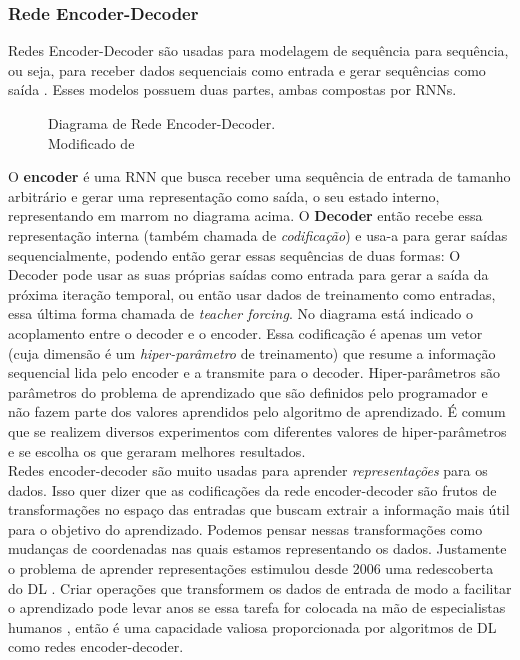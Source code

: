 \subsubsection{Rede Encoder-Decoder}
\label{sec:encdec}
Redes Encoder-Decoder são usadas para modelagem de sequência para
sequência, ou seja, para receber dados sequenciais como entrada e gerar
sequências como saída \citep{dlbook}. Esses modelos possuem duas partes, ambas compostas por
RNNs. \\

\begin{figure}[H]
\centering

\caption{ Diagrama de Rede Encoder-Decoder.\\ Modificado de \citep{encdec}}

\end{figure}
  
O \textbf{encoder} é uma RNN que busca receber uma sequência de entrada de
tamanho arbitrário e gerar uma representação como saída, o seu estado interno,
representando em marrom no diagrama acima. O \textbf{Decoder} então recebe essa representação interna (também chamada
de \textit{codificação}) e usa-a para gerar saídas sequencialmente, podendo
então gerar essas sequências de duas formas: O Decoder pode usar as suas próprias saídas
como entrada para gerar a saída da próxima iteração temporal, ou então usar dados de treinamento como
entradas, essa última forma chamada de \textit{teacher forcing}. No diagrama
está indicado o acoplamento entre o decoder e o encoder. Essa codificação é apenas
um vetor (cuja dimensão é um \textit{hiper-parâmetro} de treinamento) que resume a
informação sequencial lida pelo encoder e a transmite para o decoder.
Hiper-parâmetros são parâmetros do problema de aprendizado que são definidos
pelo programador e não fazem parte dos valores aprendidos pelo algoritmo de
aprendizado. É comum que se realizem diversos experimentos com diferentes
valores de hiper-parâmetros e se escolha os que geraram melhores resultados. 
\\

Redes encoder-decoder são muito usadas para aprender \textit{representações} para os
dados. Isso quer dizer que as codificações da rede encoder-decoder são frutos de
transformações no espaço das entradas que buscam extrair a informação mais útil
para o objetivo do aprendizado. Podemos pensar nessas transformações como
mudanças de coordenadas nas quais estamos representando os dados. Justamente o problema de aprender
representações estimulou desde 2006 uma redescoberta do DL \citep{dlbook}. Criar
operações que transformem os dados de entrada de modo a facilitar o aprendizado
pode levar anos se essa tarefa for colocada na mão de especialistas humanos
\citep{dlbook}, então é uma capacidade valiosa proporcionada por algoritmos de
DL como redes encoder-decoder. \\



